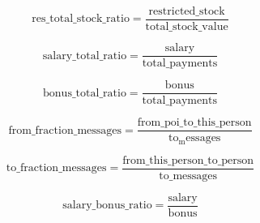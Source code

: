\documentclass[12pt]{article}%
\begin{document}
\begin{equation}
\mathrm{res\_total\_stock\_ratio} = \frac{\mathrm{restricted\_stock}}{\mathrm{total\_stock\_value}}
\end{equation}

\begin{equation}
\mathrm{salary\_total\_ratio} = \frac{\mathrm{salary}}{\mathrm{total\_payments}}
\end{equation}

\begin{equation}
\mathrm{bonus\_total\_ratio} = \frac{\mathrm{bonus}}{\mathrm{total\_payments}}
\end{equation}

\begin{equation}
\mathrm{from\_fraction\_messages} = \frac{\mathrm{from\_poi\_to\_this\_person}}{\mathrm{to_messages}}
\end{equation}

\begin{equation}
\mathrm{to\_fraction\_messages} = \frac{\mathrm{from\_this\_person\_to\_person}}{\mathrm{to\_messages}}
\end{equation}

\begin{equation}
\mathrm{salary\_bonus\_ratio} = \frac{\mathrm{salary}}{\mathrm{bonus}}
\end{equation}
\end{document}
